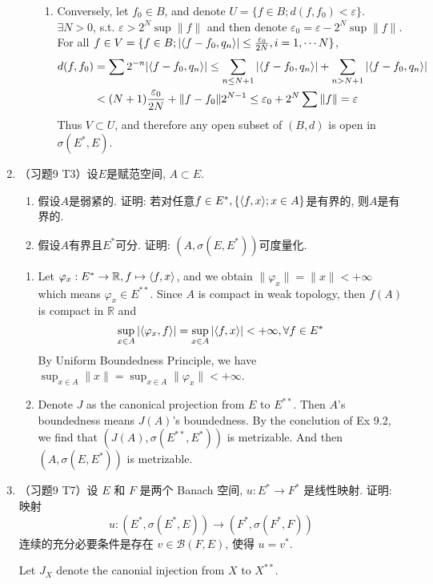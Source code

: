 \begin{enumerate}
\begin{answer}
\begin{enumerate}
\begin{enumerate}
            \item Conversely, let $f_0\in B$, and denote $U = \{ f\in B; d(f, f_0) < \varepsilon\}$. $\exists N > 0$, s.t. $\varepsilon > 2^N\sup\|f\|$ and then denote $\varepsilon_0 = \varepsilon - 2^N\sup\|f\|$. For all $f\in V = \{f\in B; |\langle f-f_0,q_n\rangle|\leq \frac{\varepsilon_0}{2N}, i = 1, \cdots N\}$,
            \[ \begin{aligned}
                d(f, f_0) &= \sum2^{-n} |\langle f-f_0,q_n\rangle| \leq \sum_{n \leq N+1} |\langle f-f_0,q_n\rangle| +  \sum_{n > N+1}|\langle f-f_0,q_n\rangle|\\
                &< (N+1) \frac{\varepsilon_0}{2N} + \|f - f_0\| 2^{N-1}\leq \varepsilon_0 + 2^N\sum\|f\|=\varepsilon
            \end{aligned}\]
            Thus $V\subset U$, and therefore any open subset of $(B, d)$ is open in $\sigma(E^*, E)$.
        \end{enumerate}
    \end{enumerate}
    \end{answer}
  \item （习题9 T3）设$E$是赋范空间, $A\subset E$. 
    \begin{enumerate}
      \item 假设$A$是弱紧的. 证明: 若对任意$f\in E^*, \{\langle f,x\rangle; x\in A\}$是有界的, 则$A$是有界的.
      \item 假设$A$有界且$E^*$可分. 证明: $(A, \sigma(E, E^*))$可度量化.
    \end{enumerate}
    \begin{answer}
      \begin{enumerate}
        \item Let $\varphi_x : E^*\to \mathbb R,f\mapsto \langle f,x\rangle$, and we obtain $\|\varphi_x\| = \|x\| < +\infty$ which means $\varphi_x\in E^{**}$. Since $A$ is compact in weak topology, then $f(A)$ is compact in $\mathbb R$ and
        \[ \sup_{x\in A}|\langle\varphi_x,f\rangle| = \sup_{x\in A} |\langle f,x\rangle| < +\infty, \forall f \in E^* \]
        By Uniform Boundedness Principle, we have $\sup_{x\in A}\|x\| = \sup_{x\in A} \|\varphi_x\| < +\infty$.
        \item Denote $J$ as the canonical projection from $E$ to $E^{**}$. Then $A$'s boundedness means $J(A)$'s boundedness. By the conclution of Ex 9.2, we find that $(J(A), \sigma(E^{**}, E^{*}))$ is metrizable. And then $(A, \sigma(E, E^*))$ is metrizable.
      \end{enumerate}
    \end{answer}
  \item （习题9 T7）设 $E$ 和 $F$ 是两个 Banach 空间, $u: E^{*} \rightarrow F^{*}$ 是线性映射. 证明: 映射
    $$
    u:\left(E^{*}, \sigma\left(E^{*}, E\right)\right) \rightarrow\left(F^{*}, \sigma\left(F^{*}, F\right)\right)
    $$
    连续的充分必要条件是存在 $v \in \mathcal{B}(F, E)$, 使得 $u=v^{*}$.
    \begin{answer}
      Let $J_X$ denote the canonial injection from $X$ to $X^{**}$. 
    

\end{answer}
\end{enumerate}
